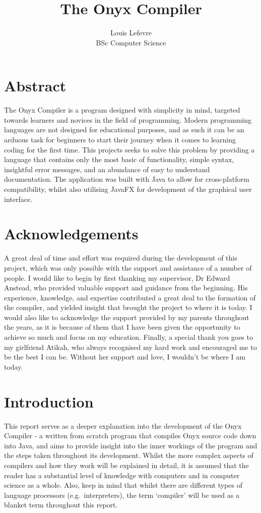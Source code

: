 \documentclass[
]{report}
\title{The Onyx Compiler}
\author{Louis Lefevre\\BSc Computer Science}
\date{}
\begin{document}
\thispagestyle{empty}
\maketitle
{}

\chapter*{Abstract}
The Onyx Compiler is a program designed with simplicity in mind,
targeted towards learners and novices in the field of programming.
Modern programming languages are not designed for educational purposes,
and as such it can be an arduous task for beginners to start their
journey when it comes to learning coding for the first time. This
projects seeks to solve this problem by providing a language that
contains only the most basic of functionality, simple syntax, insightful
error messages, and an abundance of easy to understand documentation.
The application was built with Java to allow for cross-platform
compatibility, whilst also utilising JavaFX for development of the
graphical user interface.

\chapter*{Acknowledgements}
A great deal of time and effort was required during the development of
this project, which was only possible with the support and assistance of
a number of people. I would like to begin by first thanking my
supervisor, Dr Edward Anstead, who provided valuable support and
guidance from the beginning. His experience, knowledge, and expertise
contributed a great deal to the formation of the compiler, and yielded
insight that brought the project to where it is today. I would also like
to acknowledge the support provided by my parents throughout the years,
as it is because of them that I have been given the opportunity to
achieve so much and focus on my education. Finally, a special thank you
goes to my girlfriend Atikah, who always recognised my hard work and
encouraged me to be the best I can be. Without her support and love, I
wouldn't be where I am today.

\setcounter{tocdepth}{2}
\tableofcontents

\chapter{Introduction}
This report serves as a deeper explanation into the development of the
Onyx Compiler - a written from scratch program that compiles Onyx source
code down into Java, and aims to provide insight into the inner workings
of the program and the steps taken throughout its development. Whilst
the more complex aspects of compilers and how they work will be
explained in detail, it is assumed that the reader has a substantial
level of knowledge with computers and in computer science as a whole.
Also, keep in mind that whilst there are different types of language
processors (e.g.~interpreters), the term `compiler' will be used as a
blanket term throughout this report.
\end{document}
